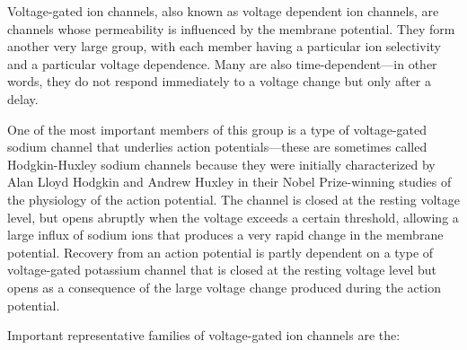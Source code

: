 Voltage-gated ion channels, also known as voltage dependent ion channels, are channels whose permeability is influenced by the membrane potential. They form another very large group, with each member having a particular ion selectivity and a particular voltage dependence. Many are also time-dependent---in other words, they do not respond immediately to a voltage change but only after a delay.

One of the most important members of this group is a type of voltage-gated sodium channel that underlies action potentials---these are sometimes called Hodgkin-Huxley sodium channels because they were initially characterized by Alan Lloyd Hodgkin and Andrew Huxley in their Nobel Prize-winning studies of the physiology of the action potential. The channel is closed at the resting voltage level, but opens abruptly when the voltage exceeds a certain threshold, allowing a large influx of sodium ions that produces a very rapid change in the membrane potential. Recovery from an action potential is partly dependent on a type of voltage-gated potassium channel that is closed at the resting voltage level but opens as a consequence of the large voltage change produced during the action potential.

Important representative families of voltage-gated ion channels are the:

